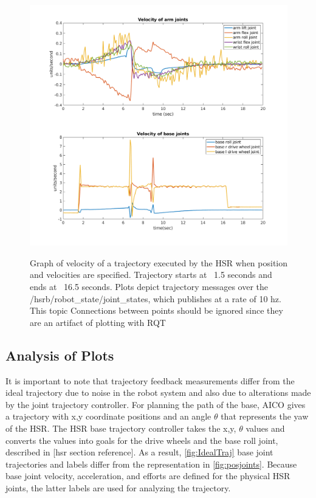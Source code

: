 \documentclass[12pt]{article}
\begin{document}
        \begin{figure}
            \centering
            \includegraphics[width=\linewidth]{2020.04.01/vel_joints.png}
            \label{fig:veljoints}
            \caption{Graph of velocity of a trajectory executed by the HSR when position and velocities are specified. Trajectory starts at ~1.5 seconds and ends at ~16.5 seconds. Plots depict trajectory messages over the /hsrb/robot\_state/joint\_states, which publishes at a rate of 10 hz. This topic Connections between points should be ignored since they are an artifact of plotting with RQT}
        \end{figure}
        


    \subsection{Analysis of Plots}
        It is important to note that trajectory feedback measurements differ from the ideal trajectory due to noise in the robot system and also due to alterations made by the joint trajectory controller. 
        For planning the path of the base, AICO gives a trajectory with x,y coordinate positions and an angle \(\theta\) that represents the yaw of the HSR. The HSR base trajectory controller takes the x,y, \(\theta\) values and converts the values into goals for the drive wheels and the base roll joint, described in [hsr section reference]. As a result, \cref{fig:IdealTraj} base joint trajectories and labels differ from the representation in \cref{fig:posjoints}. Because base joint velocity, acceleration, and efforts are defined for the physical HSR joints, the latter labels are used for analyzing the trajectory.
\end{document}
